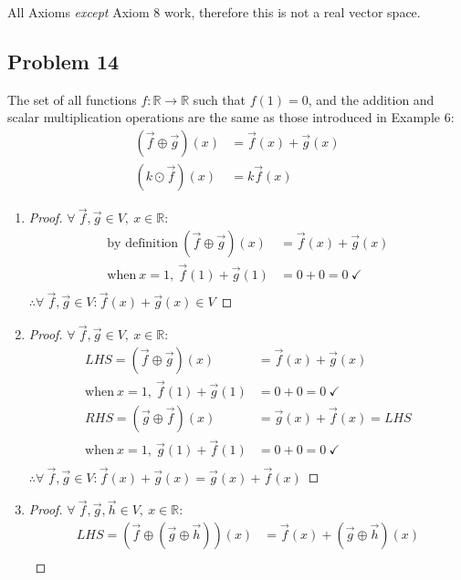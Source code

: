 \documentclass{article}
\newcommand{\bld}{\textbf}
\newcommand{\itl}{\textit}
\newcommand{\bb}{\mathbb}
\newcommand{\bitem}[1]{\item[\bld{#1.}]}
\begin{document}
All Axioms \itl{except} Axiom 8 work, therefore this is not a real vector space.

\subsection*{Problem 14} The set of all functions $f: \bb{R} \rightarrow \bb{R}$ such that $f(1)=0$,
and the addition and scalar multiplication operations are the same as those introduced in Example 6:
\begin{align*}
  (\vec{f} \oplus \vec{g})(x) & = \vec{f}(x) + \vec{g}(x) \\
  (k \odot \vec{f})(x)        & = k\vec{f}(x)
\end{align*}
\begin{enumerate}
  \bitem{Axiom 1}
  \begin{proof}
    $\forall~\vec{f},\vec{g} \in V,~x \in \bb{R}$:
    \begin{align*}
      \text{by definition}~(\vec{f} \oplus \vec{g})(x) & = \vec{f}(x) + \vec{g}(x) \\
      \text{when}~x=1,~\vec{f}(1) + \vec{g}(1)         & = 0 + 0 = 0~\checkmark    \\
    \end{align*}
    $\therefore \forall~\vec{f},\vec{g} \in V: \vec{f}(x) + \vec{g}(x) \in V$
  \end{proof}
  \bitem{Axiom 2}
  \begin{proof}
    $\forall~\vec{f},\vec{g} \in V,~x \in \bb{R}$:
    \begin{align*}
      LHS = (\vec{f} \oplus \vec{g})(x)        & = \vec{f}(x) + \vec{g}(x)       \\
      \text{when}~x=1,~\vec{f}(1) + \vec{g}(1) & = 0 + 0 = 0~\checkmark          \\
      RHS = (\vec{g} \oplus \vec{f})(x)        & = \vec{g}(x) + \vec{f}(x) = LHS \\
      \text{when}~x=1,~\vec{g}(1) + \vec{f}(1) & = 0 + 0 = 0~\checkmark          \\
    \end{align*}
    $\therefore \forall~\vec{f},\vec{g} \in V: \vec{f}(x) + \vec{g}(x) = \vec{g}(x) + \vec{f}(x)$
  \end{proof}
  \bitem{Axiom 3}
  \begin{proof}
    $\forall~\vec{f},\vec{g},\vec{h} \in V,~x \in \bb{R}$:
    \begin{align*}
      LHS = (\vec{f} \oplus (\vec{g} \oplus \vec{h}))(x)   & = \vec{f}(x) + (\vec{g} \oplus \vec{h})(x)     \\

\end{align*}
\end{proof}
\end{enumerate}
\end{document}
